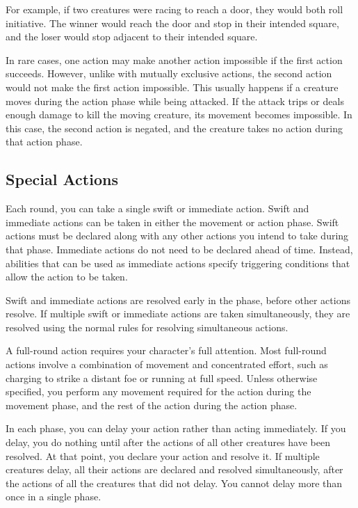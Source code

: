 For example, if two creatures were racing to reach a door, they would both roll initiative.
The winner would reach the door and stop in their intended square, and the loser would stop adjacent to their intended square.

 In rare cases, one action may make another action impossible if the first action succeeds.
However, unlike with mutually exclusive actions, the second action would not make the first action impossible.
This usually happens if a creature moves during the action phase while being attacked.
If the attack trips or deals enough damage to kill the moving creature, its movement becomes impossible.
In this case, the second action is negated, and the creature takes no action during that action phase.

\subsection{Special Actions}

\label{Swift and Immediate Actions} Each round, you can take a single swift or immediate action.
Swift and immediate actions can be taken in either the movement or action phase.
Swift actions must be declared along with any other actions you intend to take during that phase.
Immediate actions do not need to be declared ahead of time.
Instead, abilities that can be used as immediate actions specify triggering conditions that allow the action to be taken.

Swift and immediate actions are resolved early in the phase, before other actions resolve.
If multiple swift or immediate actions are taken simultaneously, they are resolved using the normal rules for resolving simultaneous actions.

 A full-round action requires your character's full attention.
Most full-round actions involve a combination of movement and concentrated effort, such as charging to strike a distant foe or running at full speed.
Unless otherwise specified, you perform any movement required for the action during the movement phase, and the rest of the action during the action phase.

\label{Delaying}
In each phase, you can delay your action rather than acting immediately.
If you delay, you do nothing until after the actions of all other creatures have been resolved.
At that point, you declare your action and resolve it.
If multiple creatures delay, all their actions are declared and resolved simultaneously, after the actions of all the creatures that did not delay.
You cannot delay more than once in a single phase.

